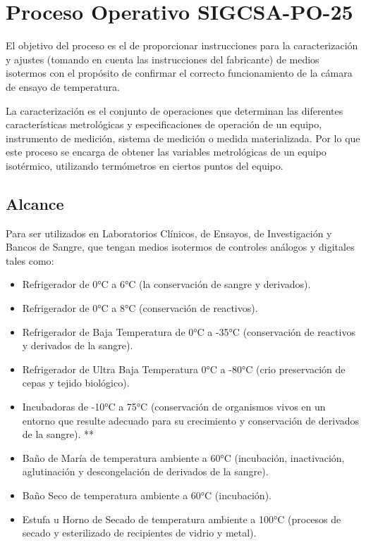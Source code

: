 \section{Proceso Operativo SIGCSA-PO-25}

\par 
El objetivo del proceso es el de proporcionar instrucciones para la caracterización y ajustes (tomando en cuenta las instrucciones
del fabricante) de medios isotermos con el propósito de confirmar el correcto funcionamiento de
la cámara de ensayo de temperatura.\cite{po25}

\par \noindent
La caracterización es el conjunto de operaciones que determinan las diferentes
características metrológicas y especificaciones de operación de un
equipo, instrumento de medición, sistema de medición o medida
materializada. Por lo que este proceso se encarga de obtener las variables metrológicas de un equipo isotérmico, utilizando termómetros en ciertos puntos del equipo.\cite{po25}

\subsection{Alcance}
\par 
Para ser utilizados en Laboratorios Clínicos, de Ensayos, de Investigación y Bancos de Sangre, que
tengan medios isotermos de controles análogos y digitales tales como\cite{po25}:

\begin{itemize}
	\item Refrigerador de 0°C a 6°C (la conservación de sangre y derivados).
	
	\item Refrigerador de 0°C a 8°C (conservación de reactivos).
	
	\item Refrigerador de Baja Temperatura de 0°C a -35°C (conservación de reactivos y derivados
	de la sangre).
	
	\item Refrigerador de Ultra Baja Temperatura 0°C a -80°C (crio preservación de cepas y tejido
	biológico).
	
	\item Incubadoras de -10°C a 75°C (conservación de organismos vivos en un entorno que
	resulte adecuado para su crecimiento y conservación de derivados de la sangre). **
	
	\item Baño de María de temperatura ambiente a 60°C (incubación, inactivación, aglutinación y
	descongelación de derivados de la sangre).
	
	\item Baño Seco de temperatura ambiente a 60°C (incubación).
	
	\item Estufa u Horno de Secado de temperatura ambiente a 100°C (procesos de secado y
	esterilizado de recipientes de vidrio y metal).
\end{itemize}

